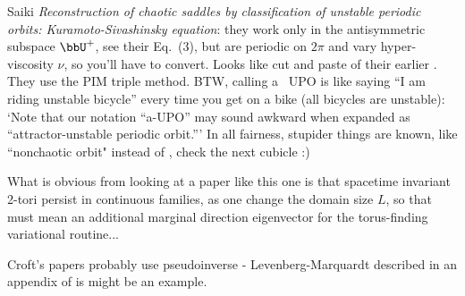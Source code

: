 \begin{description}
{Saiki\etal{} {\em Reconstruction of chaotic saddles by
classification of unstable periodic orbits: {Kuramoto-Sivashinsky} equation}:
they work only in the antisymmetric subspace $\bbU^+$, see their Eq.~(3), but are
periodic on $2\pi$ and vary hyper-viscosity $\nu$, so you'll have to convert.
Looks like cut and paste of their earlier .
They use the PIM triple method. BTW, calling a \po\  UPO is
like saying ``I am riding unstable bicycle'' every time you get on a bike
(all bicycles are unstable): `Note that our notation ``a-UPO'' may sound
awkward when expanded as ``attractor-unstable periodic orbit.''' In all
fairness, stupider things are known, like ``nonchaotic orbit" instead of \po,
check the next cubicle :)

What is obvious from looking at a paper like this one is that spacetime
invariant 2-tori persist in continuous families, as one change the domain
size $L$, so that must mean an additional marginal direction eigenvector for
the torus-finding variational routine...

Croft's papers probably use
pseudoinverse - Levenberg-\-Marq\-uardt described in an appendix of
 is might be an example.
    }








\end{description}
